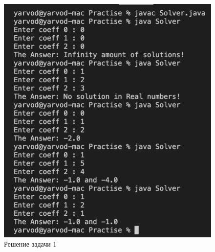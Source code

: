 \documentclass[a4paper]{article}
\begin{document}
\begin{figure}[H]
    \begin{center}
        \includegraphics[scale = 0.5]{solution_1.png}
        \caption{Решение задачи 1}
        \label{sol_1}
    \end{center}
\end{figure}
\end{document}
